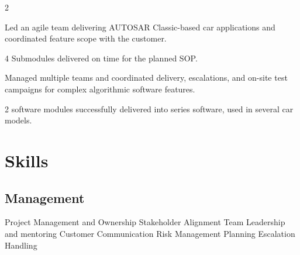 \begin{paracol}{2}
\begin{tightemize}
\item Led an agile team delivering AUTOSAR Classic-based car applications and coordinated feature scope with the customer.
\item 4 Submodules delivered on time for the planned SOP.
\end{tightemize}
\sectionsep

\begin{tightemize}
\item Managed multiple teams and coordinated delivery, escalations, and on-site test campaigns for complex algorithmic software features.
\item 2 software modules successfully delivered into series software, used in several car models.
\end{tightemize}
\sectionsep


%

\switchcolumn[1]


\section{Skills}
\subsection{Management}
\sectionsep
{}
Project Management and Ownership \textbullet{} Stakeholder Alignment \textbullet{} Team Leadership and mentoring \textbullet{} Customer Communication \textbullet{}
Risk Management \textbullet{} Planning \textbullet{} Escalation Handling \\
\sectionsep

\end{paracol}
